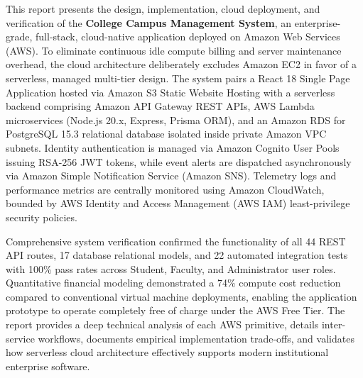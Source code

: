 \documentclass[12pt,a4paper]{report}
\begin{document}
This report presents the design, implementation, cloud deployment, and verification of the \textbf{College Campus Management System}, an enterprise-grade, full-stack, cloud-native application deployed on Amazon Web Services (AWS). To eliminate continuous idle compute billing and server maintenance overhead, the cloud architecture deliberately excludes Amazon EC2 in favor of a serverless, managed multi-tier design. The system pairs a React 18 Single Page Application hosted via Amazon S3 Static Website Hosting with a serverless backend comprising Amazon API Gateway REST APIs, AWS Lambda microservices (Node.js 20.x, Express, Prisma ORM), and an Amazon RDS for PostgreSQL 15.3 relational database isolated inside private Amazon VPC subnets. Identity authentication is managed via Amazon Cognito User Pools issuing RSA-256 JWT tokens, while event alerts are dispatched asynchronously via Amazon Simple Notification Service (Amazon SNS). Telemetry logs and performance metrics are centrally monitored using Amazon CloudWatch, bounded by AWS Identity and Access Management (AWS IAM) least-privilege security policies.

Comprehensive system verification confirmed the functionality of all 44 REST API routes, 17 database relational models, and 22 automated integration tests with 100\% pass rates across Student, Faculty, and Administrator user roles. Quantitative financial modeling demonstrated a 74\% compute cost reduction compared to conventional virtual machine deployments, enabling the application prototype to operate completely free of charge under the AWS Free Tier. The report provides a deep technical analysis of each AWS primitive, details inter-service workflows, documents empirical implementation trade-offs, and validates how serverless cloud architecture effectively supports modern institutional enterprise software.

\newpage

\tableofcontents
\newpage

\listoffigures
\newpage

\listoftables
\newpage





















\end{document}
